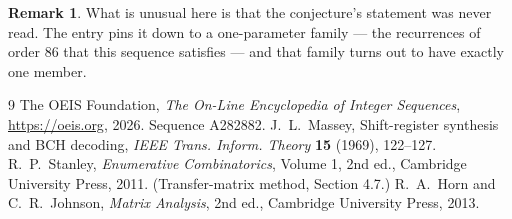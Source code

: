 \documentclass[11pt,a4paper]{article}
\theoremstyle{plain}
\theoremstyle{definition}
\newtheorem{remark}[theorem]{Remark}
\begin{document}
\begin{remark}
What is unusual here is that the conjecture's statement was never read. The entry pins it down
to a one-parameter family --- the recurrences of order $86$ that this sequence satisfies
--- and that family turns out to have exactly one member.
\end{remark}

\begin{thebibliography}{9}
 The OEIS Foundation, \emph{The On-Line Encyclopedia of Integer
Sequences}, \url{https://oeis.org}, 2026. Sequence A282882.
 J.~L.~Massey, Shift-register synthesis and BCH decoding, \emph{IEEE
Trans. Inform. Theory} \textbf{15} (1969), 122--127.
 R.~P.~Stanley, \emph{Enumerative Combinatorics}, Volume 1, 2nd ed.,
Cambridge University Press, 2011. (Transfer-matrix method, Section 4.7.)
 R.~A.~Horn and C.~R.~Johnson, \emph{Matrix Analysis}, 2nd ed., Cambridge
University Press, 2013.
\end{thebibliography}
\end{document}

